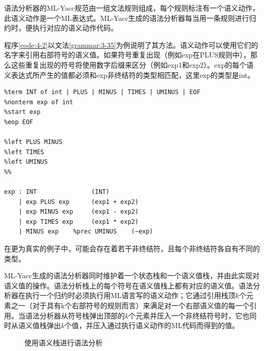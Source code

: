 \documentclass[cn,11pt,chinese]{elegantbook}
\begin{document}
语法分析器的ML-Yacc规范由一组文法规则组成，每个规则标注有一个语义动作，此语义动作是一个ML表达式。ML-Yacc生成的语法分析器每当用一条规则进行归约时，便执行对应的语义动作代码。

程序\ref{code:4-2}以文法\ref{grammar:3-35}为例说明了其方法。语义动作可以使用它们的名字来引用右部符号的语义值。如果符号重复出现（例如exp在PLUS规则中），那么这些重复出现的符号将使用数字后缀来区分（例如exp1和exp2）。exp的每个语义表达式所产生的值都必须和exp非终结符的类型相匹配，这里exp的类型是int。

\begin{lstlisting}[caption={文法\ref{grammar:3-35}的ML-Yacc版本},label={code:4-2}]
%%
%term INT of int | PLUS | MINUS | TIMES | UMINUS | EOF
%nonterm exp of int
%start exp
%eop EOF

%left PLUS MINUS
%left TIMES
%left UMINUS
%%

exp : INT               (INT)
    | exp PLUS exp      (exp1 + exp2)
    | exp MINUS exp     (exp1 - exp2)
    | exp TIMES exp     (exp1 * exp2)
    | MINUS exp    %prec UMINUS    (~exp)
\end{lstlisting}

在更为真实的例子中，可能会存在着若干非终结符，且每个非终结符各自有不同的类型。

ML-Yacc生成的语法分析器同时维护着一个状态栈和一个语义值栈，并由此实现对语义值的操作。语法分析栈上的每个符号在语义值栈上都有对应的语义值。语法分析器在执行一个归约时必须执行用ML语言写的语义动作；它通过引用栈顶$k$个元素之一（对于具有k个右部符号的规则而言）来满足对一个右部语义值的每一个引用。当语法分析器从符号栈弹出顶部的$k$个元素并压入一个非终结符号时，它也同时从语义值栈弹出$k$个值，并压入通过执行语义动作的ML代码而得到的值。

\begin{figure}[htbp]
  \centering
  {
    \fontsize{8pt}{9.6pt}\selectfont
    
  }
  \caption{使用语义栈进行语法分析}
  \label{fig:4-3}
\end{figure}
\end{document}
